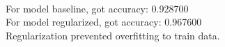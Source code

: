 \begin{answer}\\
For model baseline, got accuracy: 0.928700\\
For model regularized, got accuracy: 0.967600\\
Regularization prevented overfitting to train data.
\end{answer}
   
  
